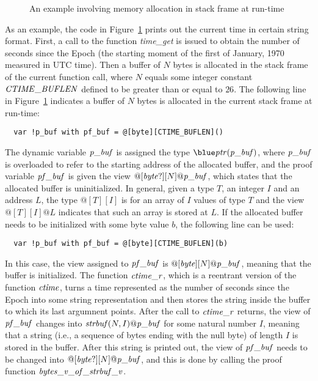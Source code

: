 \begin{figure}[thp]

\caption{An example involving memory allocation in stack frame at run-time}
\label{figure:alloca_example_1.dats}
\end{figure}
As an example, the code in Figure~\ref{figure:alloca_example_1.dats} prints
out the current time in certain string format. First, a call to the
function {\it time\_get} is issued to obtain the number of seconds since
the Epoch (the starting moment of the first of January, 1970 measured in
UTC time). Then a buffer of $N$ bytes is allocated in the stack frame of
the current function call, where $N$ equals some integer constant ${\it
CTIME\_BUFLEN}$ defined to be greater than or equal to $26$. The following
line in Figure~\ref{figure:alloca_example_1.dats} indicates a buffer of $N$
bytes is allocated in the current stack frame at run-time:
\begin{verbatim}
  var !p_buf with pf_buf = @[byte][CTIME_BUFLEN]()
\end{verbatim}
The dynamic variable ${\it p\_buf}$ is assigned the type $\tptr({\it
p\_buf})$, where ${\it p\_buf}$ is overloaded to refer to the starting
address of the allocated buffer, and the proof variable ${\it pf\_buf}$ is
given the view $@[{\it byte}?][N]@{\it p\_buf}$, which states that the
allocated buffer is uninitialized.  In general, given a type $T$, an
integer $I$ and an address $L$, the type $@[T][I]$ is for an array of $I$
values of type $T$ and the view $@[T][I]@L$ indicates that such an array is
stored at $L$.  If the allocated buffer needs to be initialized with some
byte value $b$, the following line can be used:
\begin{verbatim}
  var !p_buf with pf_buf = @[byte][CTIME_BUFLEN](b)
\end{verbatim}
In this case, the view assigned to ${\it pf\_buf}$ is $@[{\it
byte}][N]@{\it p\_buf}$, meaning that the buffer is initialized. The
function ${\it ctime\_r}$, which is a reentrant version of the function
${\it ctime}$, turns a time represented as the number of seconds since the
Epoch into some string representation and then stores the string inside the
buffer to which its last argumnent points. After the call to ${\it
ctime\_r}$ returns, the view of ${\it pf\_buf}$ changes into ${\it
strbuf}(N, I)@{\it p\_buf}$ for some natural number $I$, meaning that a
string (i.e., a sequence of bytes ending with the null byte) of length $I$
is stored in the buffer. After this string is printed out, the view of
${\it pf\_buf}$ needs to be changed into $@[{\it byte}?][N]@{\it p\_buf}$,
and this is done by calling the proof function ${\it
bytes\_v\_of\_strbuf\_v}$.

